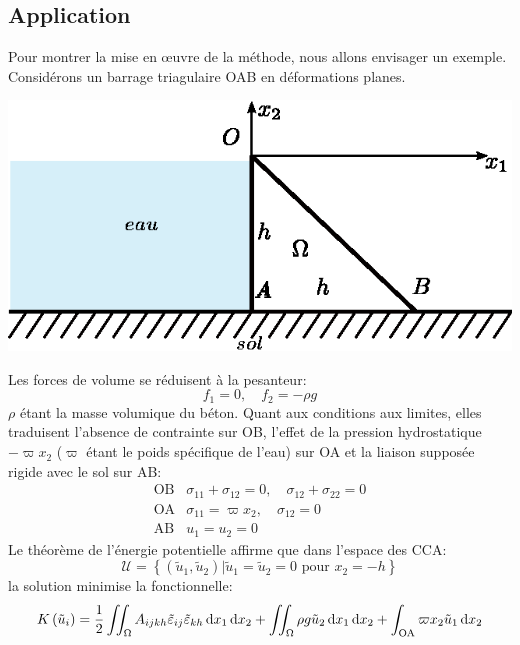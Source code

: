 \subsection{Application} \label{ssec:Ch09-3.2}
Pour montrer la mise en œuvre de la méthode, nous allons envisager un exemple.
Considérons un barrage triagulaire OAB en déformations planes.
\begin{center}
    \includegraphics{../images/T1_Ch09-05}
\end{center}
Les forces de volume se réduisent à la pesanteur: 
\begin{equation}
    f_1 = 0 ,\quad f_2 = -\rho g
    \label{eq:Ch09-067}
\end{equation}
$\rho$ étant la masse volumique du béton.
Quant aux conditions aux limites, elles traduisent l'absence de contrainte sur OB, l'effet de la pression hydrostatique $-\varpi x_2$ ($\varpi$ étant le poids spécifique de l'eau) sur OA et la liaison supposée rigide avec le sol sur AB: 
\begin{equation}
    \begin{aligned}
        \text{OB} & \sigma_{11} + \sigma_{12} = 0,\quad \sigma_{12} + \sigma_{22} = 0 \\
        \text{OA} & \sigma_{11} = \varpi x_2,\quad \sigma_{12} = 0 \\
        \text{AB} & u_1 = u_2 = 0
    \end{aligned}
    \label{eq:Ch09-068}
\end{equation}
Le théorème de l'énergie potentielle affirme que dans l'espace des CCA: 
\begin{equation}
    \mathcal{U} = \left\{ \left( \tilde{u}_1, \tilde{u}_2 \right) | \tilde{u}_1 = \tilde{u}_2 = 0 \text{ pour } x_2 = -h \right\}
    \label{eq:Ch09-069}
\end{equation}
la solution minimise la fonctionnelle: 
\begin{equation}
    K\left( \tilde{u}_i \right) = \frac{1}{2} \iint_{\Omega} A_{ijkh} \tilde{\varepsilon}_{ij} \tilde{\varepsilon}_{kh} \mathop{\mathrm{{}d}}\mathopen{} x_1 \mathop{\mathrm{{}d}}\mathopen{} x_2 + \iint_{\Omega} \rho g \tilde{u}_2 \mathop{\mathrm{{}d}}\mathopen{} x_1 \mathop{\mathrm{{}d}}\mathopen{} x_2 + \int_{\text{OA}} \varpi x_2 \tilde{u}_1 \mathop{\mathrm{{}d}}\mathopen{} x_2
    \label{eq:Ch09-070}
\end{equation}
